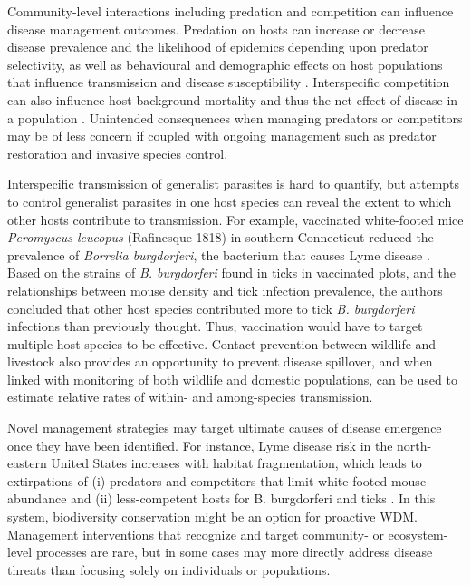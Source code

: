 Community-level interactions including predation and competition can influence disease management outcomes. Predation on hosts can increase or decrease disease prevalence and the likelihood of epidemics depending upon predator selectivity, as well as behavioural and demographic effects on host populations that influence transmission and disease susceptibility \citep{Packer2003, Holt2007}.
Interspecific competition can also influence host background mortality and thus the net effect of disease in a population \citep{bowers1997community}.
Unintended consequences when managing predators or competitors may be of less concern if coupled with ongoing management such as predator restoration and invasive species control.

Interspecific transmission of generalist parasites is hard to quantify, but attempts to control generalist parasites in one host species can reveal the extent to which other hosts contribute to transmission.
For example, vaccinated white-footed mice \textit{Peromyscus leucopus} (Rafinesque 1818) in southern Connecticut reduced the prevalence of \textit{Borrelia burgdorferi}, the bacterium that causes Lyme disease \citep{Tsao2004}.
Based on the strains of \textit{B. burgdorferi} found in ticks in vaccinated plots, and the relationships between mouse density and tick infection prevalence, the authors concluded that other host species contributed more to tick \textit{B. burgdorferi} infections than previously thought.
Thus, vaccination would have to target multiple host species to be effective. Contact prevention between wildlife and livestock also provides an opportunity to prevent disease spillover, and when linked with monitoring of both wildlife and domestic populations, can be used to estimate relative rates of within- and among-species transmission.

Novel management strategies may target ultimate causes of disease emergence once they have been identified.
For instance, Lyme disease risk in the north-eastern United States increases with habitat fragmentation, which leads to extirpations of (i) predators and competitors that limit white-footed mouse abundance and (ii) less-competent hosts for B. burgdorferi and ticks \citep{Ostfeld2003}.
In this system, biodiversity conservation might be an option for proactive WDM. Management interventions that recognize and target community- or ecosystem-level processes are rare, but in some cases may more directly address disease threats than focusing solely on individuals or populations.

